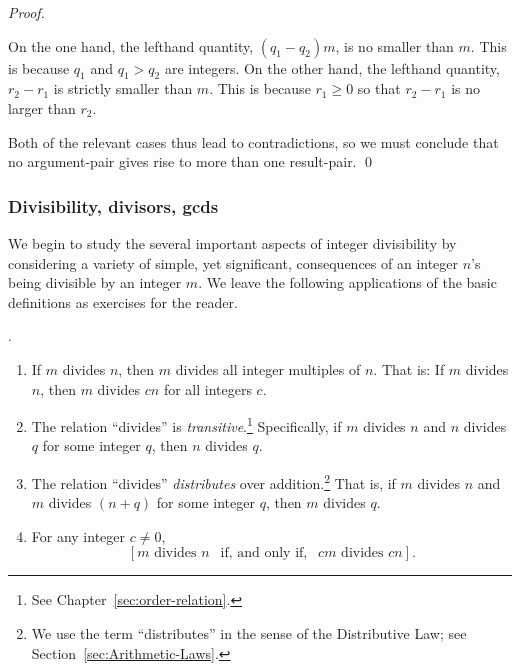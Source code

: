 \begin{proof}
\begin{itemize}
On the one hand, the lefthand quantity, $(q_1 - q_2) m$, is no smaller than $m$.  This is because $q_1$ and $q_1 > q_2$ are integers.  On the other hand, the lefthand quantity, $r_2 - r_1$ is strictly smaller than $m$.  This is because $r_1 \geq 0$ so that $r_2 - r_1$ is no larger than $r_2$.
\end{itemize}
Both of the relevant cases thus lead to contradictions, so we must conclude that no argument-pair gives rise to more than one result-pair.  \qed
\end{proof}


\subsubsection{Divisibility, divisors, {\sc gcd}s}
\label{sec:divisibility+GCD}

We begin to study the several important aspects of integer divisibility by considering a variety of simple, yet significant, consequences of an integer $n$'s being divisible by an integer $m$.  We leave the following applications of the basic definitions as exercises for the reader.

\begin{prop}.
\label{thm:basic-divisibility}
\begin{enumerate}
\item
If $m$ divides $n$, then $m$ divides all integer multiples of $n$. That is: If $m$ divides $n$, then $m$ divides $cn$ for all integers $c$.

\medskip\item
The relation ``divides'' is {\em transitive}.\footnote{See Chapter~\ref{sec:order-relation}.}  Specifically, if $m$ divides $n$ and $n$ divides $q$ for some integer $q$, then $n$ divides $q$.

\medskip\item
The relation ``divides'' {\em distributes} over addition.\footnote{We use the term ``distributes'' in the sense of the Distributive Law; see Section~\ref{sec:Arithmetic-Laws}.}  That is, if $m$ divides $n$ and $m$ divides $(n+q)$ for some integer $q$, then $m$ divides $q$.

\medskip\item 
For any integer $c \neq 0$,
\[ \left[m \mbox{ divides } n \ \ \mbox{ if, and only if, } \ \ cm \mbox{ divides } cn \right]. \]
\end{enumerate}
\end{prop}

